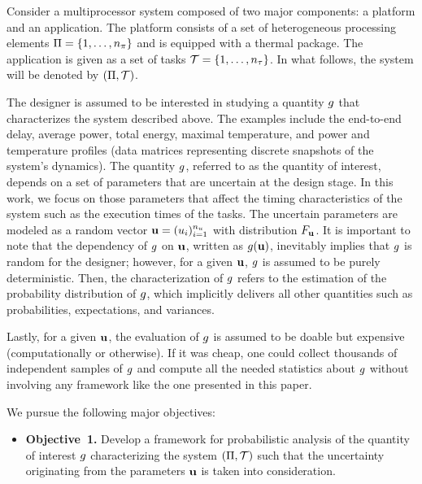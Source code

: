Consider a multiprocessor system composed of two major components: a platform
and an application. The platform consists of a set of heterogeneous processing
elements $\Pi = \{ 1, \dots, {n_\pi} \}$ and is equipped with a thermal package.
The application is given as a set of tasks $\mathcal{T} = \{ 1, \dots, {n_\tau} \}$. In
what follows, the system will be denoted by $(\Pi, \mathcal{T})$.

The designer is assumed to be interested in studying a quantity $g$ that
characterizes the system described above. The examples include the end-to-end
delay, average power, total energy, maximal temperature, and power and
temperature profiles (data matrices representing discrete snapshots of the
system's dynamics). The quantity $g$, referred to as the quantity of interest,
depends on a set of parameters that are uncertain at the design stage. In this
work, we focus on those parameters that affect the timing characteristics of the
system such as the execution times of the tasks. The uncertain parameters are
modeled as a random vector $\mathbf{u} = (u_i)_{i = 1}^{n_u}$ with distribution
$F_{\mathbf{u}}$. It is important to note that the dependency of $g$ on
$\mathbf{u}$, written as $g(\mathbf{u})$, inevitably implies that $g$ is random for the
designer; however, for a given $\mathbf{u}$, $g$ is assumed to be purely
deterministic. Then, the characterization of $g$ refers to the estimation of
the probability distribution of $g$, which implicitly delivers all other
quantities such as probabilities, expectations, and variances.

Lastly, for a given $\mathbf{u}$, the evaluation of $g$ is assumed to be doable but
expensive (computationally or otherwise). If it was cheap, one could collect
thousands of independent samples of $g$ and compute all the needed statistics
about $g$ without involving any framework like the one presented in this paper.

We pursue the following major objectives:
\begin{itemize}

\item \textbf{Objective~1.} Develop a framework for probabilistic analysis of
  the quantity of interest $g$ characterizing the system $(\Pi, \mathcal{T})$
  such that the uncertainty originating from the parameters $\mathbf{u}$ is taken into
  consideration.

\end{itemize}
